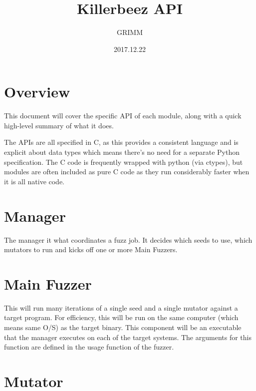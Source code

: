 \documentclass{article}
\title{Killerbeez API}
\author{GRIMM}
\date{2017.12.22}
\begin{document}
\thispagestyle{empty}
\maketitle
\newpage

\tableofcontents
\newpage

\section{Overview}
This document will cover the specific API of each module, along with a quick
high-level summary of what it does.

\par
The APIs are all specified in C, as this provides a consistent language and is
explicit about data types which means there's no need for a separate Python
specification.  The C code is frequently wrapped with python (via ctypes), but
modules are often included as pure C code as they run considerably faster when
it is all native code.

\section{Manager}
The manager it what coordinates a fuzz job.  It decides which seeds to use,
which mutators to run and kicks off one or more Main Fuzzers.

\section{Main Fuzzer}
This will run many iterations of a single seed and a single mutator against a
target program.  For efficiency, this will be run on the same computer (which
means same O/S) as the target binary.  This component will be an executable that
the manager executes on each of the target systems.  The arguments for this
function are defined in the usage function of the fuzzer.

\section{Mutator}






\end{document}
